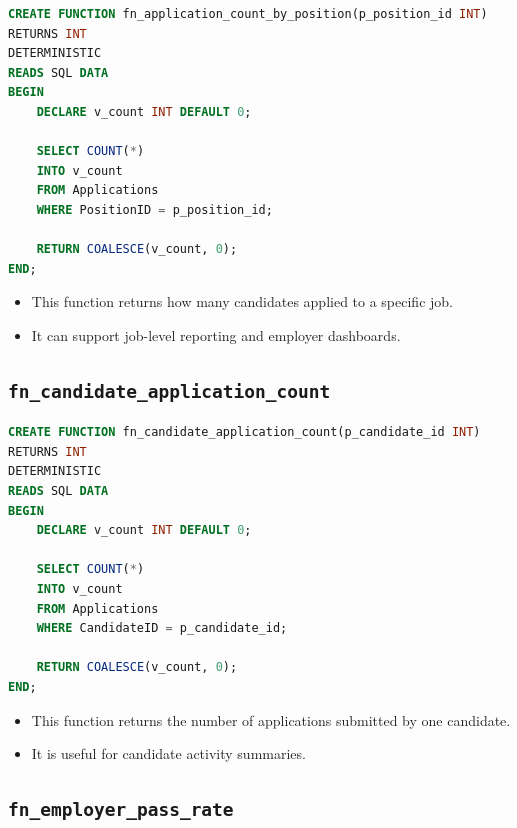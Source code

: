 \documentclass[11pt,a4paper]{report}
\begin{document}
\begin{lstlisting}[language=SQL,caption={Function that counts applications for one job}]
CREATE FUNCTION fn_application_count_by_position(p_position_id INT)
RETURNS INT
DETERMINISTIC
READS SQL DATA
BEGIN
    DECLARE v_count INT DEFAULT 0;

    SELECT COUNT(*)
    INTO v_count
    FROM Applications
    WHERE PositionID = p_position_id;

    RETURN COALESCE(v_count, 0);
END;
\end{lstlisting}

\begin{itemize}[leftmargin=1.2cm,itemsep=0.1em]
  \item This function returns how many candidates applied to a specific job.
  \item It can support job-level reporting and employer dashboards.
\end{itemize}

\subsection*{\texttt{fn\_candidate\_application\_count}}

\begin{lstlisting}[language=SQL,caption={Function that counts applications by candidate}]
CREATE FUNCTION fn_candidate_application_count(p_candidate_id INT)
RETURNS INT
DETERMINISTIC
READS SQL DATA
BEGIN
    DECLARE v_count INT DEFAULT 0;

    SELECT COUNT(*)
    INTO v_count
    FROM Applications
    WHERE CandidateID = p_candidate_id;

    RETURN COALESCE(v_count, 0);
END;
\end{lstlisting}

\begin{itemize}[leftmargin=1.2cm,itemsep=0.1em]
  \item This function returns the number of applications submitted by one candidate.
  \item It is useful for candidate activity summaries.
\end{itemize}

\subsection*{\texttt{fn\_employer\_pass\_rate}}
\end{document}
